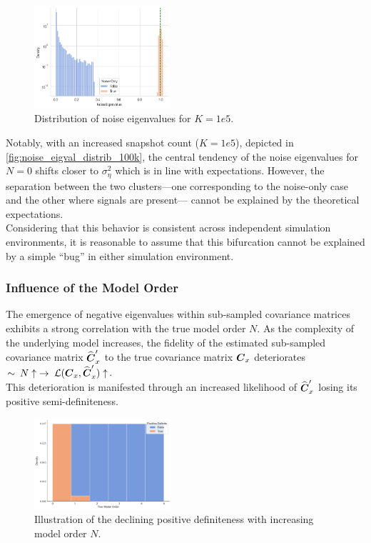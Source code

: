 \begin{figure}[H]
    \centering
    \includegraphics[width=0.45\textwidth]{figures/04_ModelOrderEstimation/noise_eigval_distrib_100k.png}
    \caption{Distribution of noise eigenvalues for \( K = 1e5 \).}
    \label{fig:noise_eigval_distrib_100k}
\end{figure}
Notably, with an increased snapshot count (\( K = 1e5 \)), depicted in \autoref{fig:noise_eigval_distrib_100k}, the
central tendency of the noise eigenvalues for \( N = 0 \) shifts closer to \( \sigma^2_\eta \) which is
in line with expectations. However, the separation between the two clusters—one corresponding to the noise-only case and
the other where signals are present— cannot be explained by the theoretical expectations. \\
Considering that this behavior is consistent across independent simulation environments, it is reasonable to assume that
this bifurcation cannot be explained by a simple ``bug'' in either simulation environment.\\

\subsubsection{Influence of the Model Order}
The emergence of negative eigenvalues within sub-sampled covariance matrices exhibits a strong correlation with the
true model order \( N \). As the complexity of the underlying model increases, the fidelity of the estimated sub-sampled covariance matrix
\( \widehat{\boldsymbol{C}}'_x \) to the true covariance matrix \( \boldsymbol{C}_x \) deteriorates \(\sim\: N \uparrow\; \rightarrow \; \mathcal{L}(\boldsymbol{C}_x, \widehat{\boldsymbol{C}}'_x) \uparrow \).\\
This deterioration is manifested through an increased likelihood of \( \widehat{\boldsymbol{C}}'_x \) losing its positive semi-definiteness.

\begin{figure}[H]
    \centering
    \includegraphics[width=0.45\textwidth]{figures/04_ModelOrderEstimation/eigval_PD_N.png}
    \caption{Illustration of the declining positive definiteness with increasing model order \( N \).}
    \label{fig:eigval_pd_n}
\end{figure}

